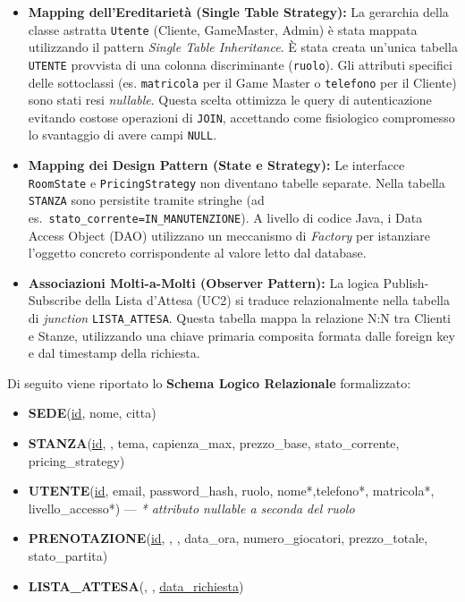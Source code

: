 \begin{itemize}[leftmargin=*]
\raggedright
\setlength{\emergencystretch}{3em}
    \item \textbf{Mapping dell'Ereditarietà (Single Table Strategy):} La gerarchia della classe astratta \texttt{Utente} (Cliente, GameMaster, Admin) è stata mappata utilizzando il pattern \textit{Single Table Inheritance}. È stata creata un'unica tabella \texttt{UTENTE} provvista di una colonna discriminante (\texttt{ruolo}). Gli attributi specifici delle sottoclassi (es. \texttt{matricola} per il Game Master o \texttt{telefono} per il Cliente) sono stati resi \textit{nullable}. Questa scelta ottimizza le query di autenticazione evitando costose operazioni di \texttt{JOIN}, accettando come fisiologico compromesso lo svantaggio di avere campi \texttt{NULL}.
    
    \item \textbf{Mapping dei Design Pattern (State e Strategy):} Le interfacce \texttt{RoomState} e \texttt{PricingStrategy} non diventano tabelle separate. Nella tabella \texttt{STANZA} sono persistite tramite stringhe (ad es.\ \texttt{stato\_corrente\allowbreak=\allowbreak IN\_MANUTENZIONE}). A livello di codice Java, i Data Access Object (DAO) utilizzano un meccanismo di \textit{Factory} per istanziare l'oggetto concreto corrispondente al valore letto dal database.
    
    \item \textbf{Associazioni Molti-a-Molti (Observer Pattern):} La logica Publish-Subscribe della Lista d'Attesa (UC2) si traduce relazionalmente nella tabella di \textit{junction} \texttt{LISTA\_ATTESA}. Questa tabella mappa la relazione N:N tra Clienti e Stanze, utilizzando una chiave primaria composita formata dalle foreign key e dal timestamp della richiesta.
\end{itemize}

\vspace{0.3cm}
\noindent Di seguito viene riportato lo \textbf{Schema Logico Relazionale} formalizzato:

\begin{itemize}[leftmargin=*]
\emergencystretch=3em
    \item \textbf{SEDE}(\underline{id}, nome, citta)
    \item \textbf{STANZA}(\underline{id}, , tema, capienza\_max, prezzo\_base, stato\_corrente, pricing\_strategy)
    \item \textbf{UTENTE}(\underline{id}, email, password\_hash, ruolo, nome*,\newline telefono*, matricola*, livello\_accesso*) --- {\small\textit{* attributo nullable a seconda del ruolo}}
    \item \textbf{PRENOTAZIONE}(\underline{id}, , , data\_ora, numero\_giocatori, prezzo\_totale, stato\_partita)
    \item \textbf{LISTA\_ATTESA}(\underline{}, \underline{}, \underline{data\_richiesta})
\end{itemize}

